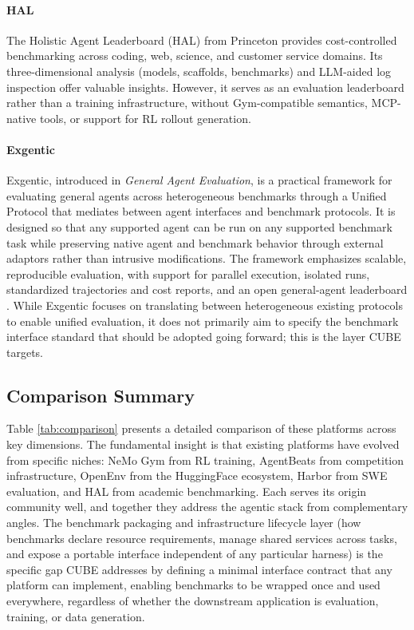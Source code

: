 \documentclass{article}
\theoremstyle{plain}
\theoremstyle{definition}
\theoremstyle{remark}
\begin{document}
\paragraph{HAL} The Holistic Agent Leaderboard (HAL) \citep{kapoor2025holisticagentleaderboardmissing} from Princeton provides cost-controlled benchmarking across coding, web, science, and customer service domains. Its three-dimensional analysis (models, scaffolds, benchmarks) and LLM-aided log inspection offer valuable insights. However, it serves as an evaluation leaderboard rather than a training infrastructure, without Gym-compatible semantics, MCP-native tools, or support for RL rollout generation.

\paragraph{Exgentic} Exgentic, introduced in \emph{General Agent Evaluation}, is a practical framework for evaluating general agents across heterogeneous benchmarks through a Unified Protocol that mediates between agent interfaces and benchmark protocols. It is designed so that any supported agent can be run on any supported benchmark task while preserving native agent and benchmark behavior through external adaptors rather than intrusive modifications. The framework emphasizes scalable, reproducible evaluation, with support for parallel execution, isolated runs, standardized trajectories and cost reports, and an open general-agent leaderboard \citep{bandel2026generalagent, bandel2026agentic, bandel2026generalagentblog}. While Exgentic focuses on translating between heterogeneous existing protocols to enable unified evaluation, it does not primarily aim to specify the benchmark interface standard that should be adopted going forward; this is the layer CUBE targets.

\subsection{Comparison Summary}

Table \ref{tab:comparison} presents a detailed comparison of these platforms across key dimensions. The fundamental insight is that existing platforms have evolved from specific niches: NeMo Gym from RL training, AgentBeats from competition infrastructure, OpenEnv from the HuggingFace ecosystem, Harbor from SWE evaluation, and HAL from academic benchmarking. Each serves its origin community well, and together they address the agentic stack from complementary angles. The benchmark packaging and infrastructure lifecycle layer (how benchmarks declare resource requirements, manage shared services across tasks, and expose a portable interface independent of any particular harness) is the specific gap CUBE addresses by defining a minimal interface contract that any platform can implement, enabling benchmarks to be wrapped once and used everywhere, regardless of whether the downstream application is evaluation, training, or data generation.
\end{document}
